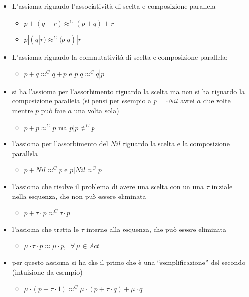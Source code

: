 \begin{itemize}
  \item L'assioma riguardo l'associatività di scelta e composizione parallela
  \begin{itemize}
      \item $p+(q+r)\approx^C (p+q)+r$
      \item $p|(q|r)\approx^C (p|q)|r$ 
  \end{itemize}
  \item L'assioma riguardo la commutatività di scelta e composizione parallela:
  \begin{itemize}
      \item $p+q\approx^C q+p$ e $p|q\approx^Cq|p$
  \end{itemize}
  \item  si ha l'assioma per
  l'assorbimento riguardo la scelta ma non si ha riguardo la composizione
  parallela (si pensi per esempio a $p=\cdot Nil$ avrei $a$ due volte mentre $p$
  può fare $a$ una volta sola)  
  \begin{itemize}
      \item $p+p\approx^C p$ ma $p|p\not\approx^C p$
  \end{itemize}
  \item l'assioma
  per l'assorbimento del $Nil$ riguardo la scelta e la composizione parallela
  \begin{itemize}
      \item $p+Nil\approx^C p$ e $p|Nil \approx^Cp$
  \end{itemize}
  \item l'assioma che risolve il
  problema di avere una scelta con un una $\tau$ iniziale nella sequenza, che
  non può essere eliminata
  \begin{itemize}
      \item $p+\tau\cdot p\approx^C\tau\cdot p$
  \end{itemize}
  \item l'assioma che
  tratta le $\tau$ interne alla sequenza, che può essere eliminata
  \begin{itemize}
      \item $\mu\cdot \tau\cdot p\approx \mu\cdot p,\,\,\,\forall\,\mu\in Act$
  \end{itemize} 
  \item per questo assioma si ha che il primo che è una ``semplificazione''
  del secondo (intuizione da esempio)
  \begin{itemize}
      \item $\mu\cdot(p+\tau\cdot 1)\approx^C\mu\cdot(p+\tau\cdot q)+\mu\cdot q$
  \end{itemize}
\end{itemize}
